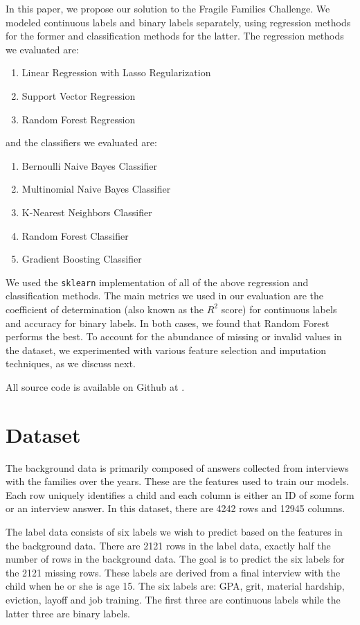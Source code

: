 \documentclass{article} %
\begin{document}
In this paper, we propose our solution to the Fragile Families Challenge. We modeled continuous labels and binary labels separately, using regression methods for the former and classification methods for the latter. The regression methods we evaluated are:

\begin{enumerate}
\item Linear Regression with Lasso Regularization
\item Support Vector Regression
\item Random Forest Regression
\end{enumerate}
and the classifiers we evaluated are:
\begin{enumerate}
\item Bernoulli Naive Bayes Classifier
\item Multinomial Naive Bayes Classifier
\item K-Nearest Neighbors Classifier
\item Random Forest Classifier
\item Gradient Boosting Classifier
\end{enumerate}

We used the \texttt{sklearn} implementation of all of the above regression and classification methods. The main metrics we used in our evaluation are the coefficient of determination (also known as the $R^2$ score) for continuous labels and accuracy for binary labels. In both cases, we found that Random Forest performs the best. To account for the abundance of missing or invalid values in the dataset, we experimented with various feature selection and imputation techniques, as we discuss next.

All source code is available on Github at \cite{myrepo}.

\section{Dataset}
\label{sec:dataset}

The background data is primarily composed of answers collected from interviews with the families over the years. These are the features used to train our models. Each row uniquely identifies a child and each column is either an ID of some form or an interview answer. In this dataset, there are 4242 rows and 12945 columns.

The label data consists of six labels we wish to predict based on the features in the background data. There are 2121 rows in the label data, exactly half the number of rows in the background data. The goal is to predict the six labels for the 2121 missing rows. These labels are derived from a final interview with the child when he or she is age 15. The six labels are: GPA, grit, material hardship, eviction, layoff and job training. The first three are continuous labels while the latter three are binary labels.
\end{document}
